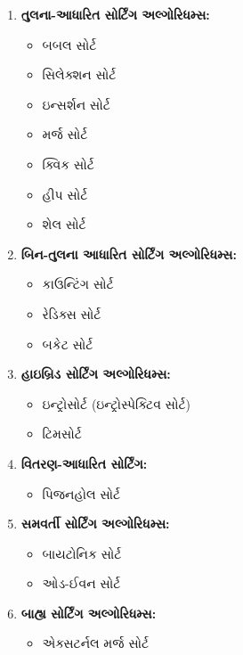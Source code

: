 \begin{enumerate}
\def\labelenumi{\arabic{enumi}.}
\tightlist
\item
  \textbf{તુલના-આધારિત સોર્ટિંગ અલ્ગોરિધમ્સ:}

  \begin{itemize}
  \tightlist
  \item
    બબલ સોર્ટ
  \item
    સિલેક્શન સોર્ટ
  \item
    ઇન્સર્શન સોર્ટ
  \item
    મર્જ સોર્ટ
  \item
    ક્વિક સોર્ટ
  \item
    હીપ સોર્ટ
  \item
    શેલ સોર્ટ
  \end{itemize}
\item
  \textbf{બિન-તુલના આધારિત સોર્ટિંગ અલ્ગોરિધમ્સ:}

  \begin{itemize}
  \tightlist
  \item
    કાઉન્ટિંગ સોર્ટ
  \item
    રેડિક્સ સોર્ટ
  \item
    બકેટ સોર્ટ
  \end{itemize}
\item
  \textbf{હાઇબ્રિડ સોર્ટિંગ અલ્ગોરિધમ્સ:}

  \begin{itemize}
  \tightlist
  \item
    ઇન્ટ્રોસોર્ટ (ઇન્ટ્રોસ્પેક્ટિવ સોર્ટ)
  \item
    ટિમસોર્ટ
  \end{itemize}
\item
  \textbf{વિતરણ-આધારિત સોર્ટિંગ:}

  \begin{itemize}
  \tightlist
  \item
    પિજનહોલ સોર્ટ
  \end{itemize}
\item
  \textbf{સમવર્તી સોર્ટિંગ અલ્ગોરિધમ્સ:}

  \begin{itemize}
  \tightlist
  \item
    બાયટોનિક સોર્ટ
  \item
    ઓડ-ઈવન સોર્ટ
  \end{itemize}
\item
  \textbf{બાહ્ય સોર્ટિંગ અલ્ગોરિધમ્સ:}

  \begin{itemize}
  \tightlist
  \item
    એક્સટર્નલ મર્જ સોર્ટ
  \end{itemize}
\end{enumerate}


